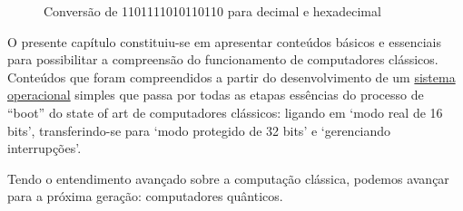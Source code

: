 \vspace{1cm}
\begin{figure}[H] \centering 
  \caption{\label{fig:4} Conversão de 1101111010110110 para decimal e hexadecimal} 
\end{figure}

O presente capítulo constituiu-se em apresentar conteúdos básicos e essenciais para possibilitar a compreensão do funcionamento de computadores clássicos. Conteúdos que foram compreendidos a partir do desenvolvimento de um \href{https://github.com/gzsig/zsig-OS}{sistema operacional} simples que passa por todas as etapas essências do processo de ``boot'' do state of art de computadores clássicos: ligando em `modo real de 16 bits', transferindo-se para `modo protegido de 32 bits' e `gerenciando interrupções'.

Tendo o entendimento avançado sobre a computação clássica, podemos avançar para a próxima geração: computadores quânticos.
\newpage
